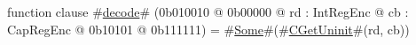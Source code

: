 function clause #\hyperref[zdecode]{decode}# (0b010010 @ 0b00000 @ rd : IntRegEnc @ cb : CapRegEnc @   0b10101 @ 0b111111) = #\hyperref[zSome]{Some}#(#\hyperref[zCGetUninit]{CGetUninit}#(rd, cb))
